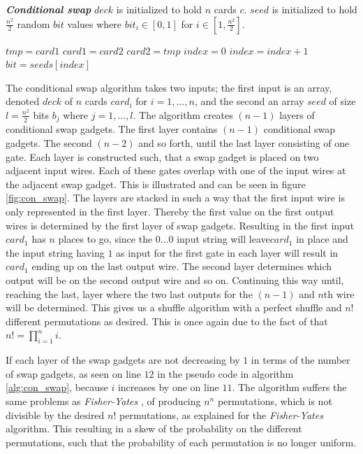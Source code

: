 \documentclass[twoside,11pt,openright]{report}
\newcommand{\FY}{\textit{Fisher-Yates} }
\begin{document}
\begin{algorithm}[t]
\caption{\textbf{\textit{Conditional swap}} \newline
    $deck$ is initialized to hold $n$ cards $c$. \newline
    $seed$ is initialized to hold $\frac{n^2}{2}$ random $bit$ values where $bit_i\in[0,1]$ for $i\in [1,\frac{n^2}{2}]$.
}
\label{alg:con_swap}

\begin{algorithmic}[1]
\State $tmp = card1$
\State $card1 = card2$
\State $card2 = tmp$
\EndIf
\EndFunction
\State
{}
\State $index = 0$
\State $index = index + 1$
\State $bit = seeds[index]$
\State {}
\EndFor
\EndFor
\EndFunction
\end{algorithmic}
\end{algorithm}


The conditional swap algorithm takes two inputs; the first input is an array, denoted $deck$ of $n$ cards $card_i$ for $i=1,\dots,n$, and the second an array $seed$ of size $l=\frac{n^2}{2}$ bits $b_j$ where $j=1,\dots, l$. The algorithm creates $(n-1)$ layers of conditional swap gadgets. The first layer contains $(n-1)$ conditional swap gadgets. The second $(n-2)$ and so forth, until the last layer consisting of one gate. Each layer is constructed such, that a swap gadget is placed on two adjacent input wires. Each of these gates overlap with one of the input wires at the adjacent swap gadget. This is illustrated and can be seen in figure \ref{fig:con_swap}. The layers are stacked in such a way that the first input wire is only represented in the first layer. Thereby the first value on the first output wires is determined by the first layer of swap gadgets. Resulting in the first input $card_1$ has $n$ places to go, since the $0\dots0$ input string will leave$card_1$ in place and the input string having $1$ as input for the first gate in each layer will result in $card_1$ ending up on the last output wire. The second layer determines which output will be on the second output wire and so on. Continuing this way until, reaching the last, layer where the two last outputs for the $(n-1)$ and $n$th wire will be determined. This gives us a shuffle algorithm with a perfect shuffle and $n!$ different permutations as desired. This is once again due to the fact of that $n!=\prod_{i=1}^n i$.

If each layer of the swap gadgets are not decreasing by $1$ in terms of the number of swap gadgets, as seen on line $12$ in the pseudo code in algorithm \ref{alg:con_swap}, because $i$ increases by one on line $11$. The algorithm suffers the same problems as \FY, of producing $n^n$ permutations, which is not divisible by the desired $n!$ permutations, as explained for the \FY algorithm. This resulting in a skew of the probability on the different permutations, such that the probability of each permutation is no longer uniform.
\end{document}
